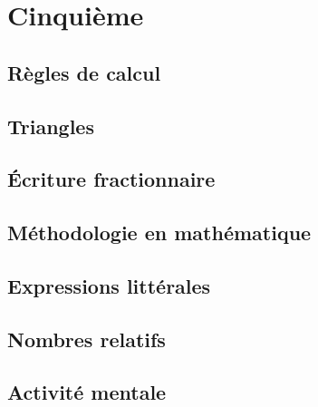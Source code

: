 \documentclass[a4paper,12pt]{book}
\begin{document}



\newpage



\tableofcontents

\newpage

\part{Cinquième}

\chapter{Règles de calcul}


\chapter{Triangles}


\chapter{Écriture fractionnaire}


\chapter{Méthodologie en mathématique}


\chapter{Expressions littérales}


\chapter{Nombres relatifs}



\chapter{Activité mentale}

\end{document}
